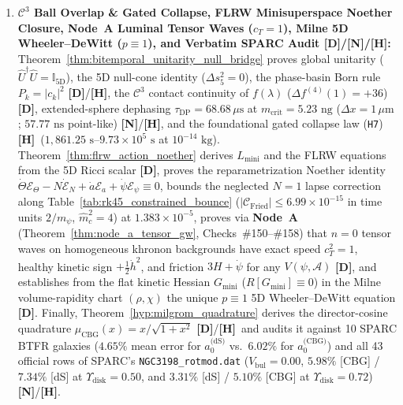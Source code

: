 \documentclass[11pt,a4paper]{article}
\newcommand{\catD}{\textbf{\textcolor{blue!75!black}{[D]}}}
\newcommand{\catH}{\textbf{\textcolor{orange!85!black}{[H]}}}
\newcommand{\catN}{\textbf{\textcolor{teal!75!black}{[N]}}}
\theoremstyle{definition}
\theoremstyle{remark}
\begin{document}
\begin{enumerate}
  \item \textbf{$\mathcal{C}^3$ Ball Overlap \& Gated Collapse, FLRW Minisuperspace Noether Closure, Node~A Luminal Tensor Waves ($c_T = 1$), Milne 5D Wheeler--DeWitt ($p \equiv 1$), and Verbatim SPARC Audit \catD/\catN/\catH:} Theorem~\ref{thm:bitemporal_unitarity_null_bridge} proves global unitarity ($\hat{U}^\dagger\hat{U} = \mathbb{I}_{5\text{D}}$), the 5D null-cone identity ($\Delta s_5^2 = 0$), the phase-basin Born rule $P_k = |c_k|^2$ \catD/\catH, the $\mathcal{C}^3$ contact continuity of $f(\lambda)$ ($\Delta f^{(4)}(1) = +36$) \catD, extended-sphere dephasing $\tau_{\text{DP}} = 68.68\,\mu\text{s}$ at $m_{\text{crit}} = 5.23\text{ ng}$ ($\Delta x = 1\,\mu\text{m}$; $57.77\text{ ns}$ point-like) \catN/\catH, and the foundational gated collapse law (\texttt{H7}) \catH\ ($1{,}861.25\text{ s}\text{--}9.73\times 10^5\text{ s}$ at $10^{-14}\text{ kg}$). Theorem~\ref{thm:flrw_action_noether} derives $L_{\text{mini}}$ and the FLRW equations from the 5D Ricci scalar \catD, proves the reparametrization Noether identity $\dot{\Theta}\mathcal{E}_{\Theta} - N\dot{\mathcal{E}}_N + \dot{a}\mathcal{E}_a + \dot{\psi}\mathcal{E}_{\psi} \equiv 0$, bounds the neglected $N = 1$ lapse correction along Table~\ref{tab:rk45_constrained_bounce} ($|\mathcal{C}_{\text{Fried}}| \le 6.99 \times 10^{-15}$ in time units $2/m_{\psi}$, $\hat{m}_c^2 = 4$) at $1.383 \times 10^{-5}$, proves via \textbf{Node~A} (Theorem~\ref{thm:node_a_tensor_gw}, Checks~\#150--\#158) that $n = 0$ tensor waves on homogeneous khronon backgrounds have exact speed $c_T^2 = 1$, healthy kinetic sign $+\frac{1}{2}\dot{h}^2$, and friction $3H + \dot{\psi}$ for any $V(\psi, \mathcal{A})$ \catD, and establishes from the flat kinetic Hessian $G_{\text{mini}}$ ($R[G_{\text{mini}}] \equiv 0$) in the Milne volume-rapidity chart $(\rho, \chi)$ the unique $p \equiv 1$ 5D Wheeler--DeWitt equation \catD. Finally, Theorem~\ref{hyp:milgrom_quadrature} derives the director-cosine quadrature $\mu_{\text{CBG}}(x) = x/\sqrt{1+x^2}$ \catD/\catH\ and audits it against 10 SPARC BTFR galaxies ($4.65\%$ mean error for $a_0^{\text{(dS)}}$ vs.\ $6.02\%$ for $a_0^{\text{(CBG)}}$) and all 43 official rows of SPARC's \texttt{NGC3198\_rotmod.dat} ($V_{\text{bul}} = 0.00$, $5.98\%$ [CBG] / $7.34\%$ [dS] at $\Upsilon_{\text{disk}} = 0.50$, and $3.31\%$ [dS] / $5.10\%$ [CBG] at $\Upsilon_{\text{disk}} = 0.72$) \catN/\catH.
\end{enumerate}

\appendix
\end{document}
